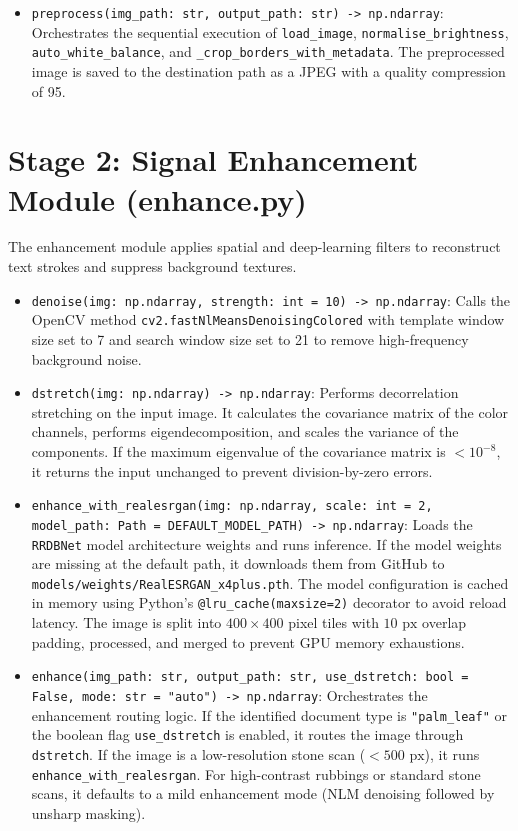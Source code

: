 \begin{itemize}
	\item \texttt{preprocess(img\_path: str, output\_path: str) -> np.ndarray}:
	Orchestrates the sequential execution of \texttt{load\_image}, \texttt{normalise\_brightness}, \texttt{auto\_white\_balance}, and \texttt{\_crop\_borders\_with\_metadata}. The preprocessed image is saved to the destination path as a JPEG with a quality compression of 95.
\end{itemize}

\section{Stage 2: Signal Enhancement Module (enhance.py)}

The enhancement module applies spatial and deep-learning filters to reconstruct text strokes and suppress background textures.

\begin{itemize}
	\item \texttt{denoise(img: np.ndarray, strength: int = 10) -> np.ndarray}:
	Calls the OpenCV method \texttt{cv2.fastNlMeansDenoisingColored} with template window size set to 7 and search window size set to 21 to remove high-frequency background noise.
	
	\item \texttt{dstretch(img: np.ndarray) -> np.ndarray}:
	Performs decorrelation stretching on the input image. It calculates the covariance matrix of the color channels, performs eigendecomposition, and scales the variance of the components. If the maximum eigenvalue of the covariance matrix is $< 10^{-8}$, it returns the input unchanged to prevent division-by-zero errors.
	
	\item \texttt{enhance\_with\_realesrgan(img: np.ndarray, scale: int = 2, model\_path: Path = DEFAULT\_MODEL\_PATH) -> np.ndarray}:
	Loads the \texttt{RRDBNet} model architecture weights and runs inference. If the model weights are missing at the default path, it downloads them from GitHub to \texttt{models/weights/RealESRGAN\_x4plus.pth}. The model configuration is cached in memory using Python's \texttt{@lru\_cache(maxsize=2)} decorator to avoid reload latency. The image is split into $400 \times 400$ pixel tiles with $10\text{ px}$ overlap padding, processed, and merged to prevent GPU memory exhaustions.
	
	\item \texttt{enhance(img\_path: str, output\_path: str, use\_dstretch: bool = False, mode: str = "auto") -> np.ndarray}:
	Orchestrates the enhancement routing logic. If the identified document type is \texttt{"palm\_leaf"} or the boolean flag \texttt{use\_dstretch} is enabled, it routes the image through \texttt{dstretch}. If the image is a low-resolution stone scan ($< 500\text{ px}$), it runs \texttt{enhance\_with\_realesrgan}. For high-contrast rubbings or standard stone scans, it defaults to a mild enhancement mode (NLM denoising followed by unsharp masking).
\end{itemize}

